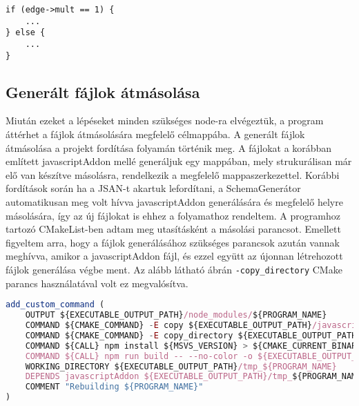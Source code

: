 \begin{lstlisting}[caption={Él szetterek fájlba írása},label={lst:edgefilter}, style={CStyle}]
if (edge->mult == 1) {
    ...
} else {
    ...
}
\end{lstlisting}

\subsection{Generált fájlok átmásolása}

Miután ezeket a lépéseket minden szükséges node-ra elvégeztük, a program áttérhet a fájlok átmásolására megfelelő célmappába.
A generált fájlok átmásolása a projekt fordítása folyamán történik meg. A fájlokat a korábban említett javascriptAddon mellé generáljuk egy mappában, mely strukurálisan már elő van készítve másolásra, rendelkezik a megfelelő mappaszerkezettel. Korábbi fordítások során ha a JSAN-t akartuk lefordítani, a SchemaGenerátor automatikusan meg volt hívva javascriptAddon generálására és megfelelő helyre másolására, így az új fájlokat is ehhez a folyamathoz rendeltem. A programhoz tartozó CMakeList-ben adtam meg utasításként a másolási parancsot. Emellett figyeltem arra, hogy a fájlok generálásához szükséges parancsok azután vannak meghívva, amikor a javascriptAddon fájl, és ezzel együtt az újonnan létrehozott fájlok generálása végbe ment.
Az alább látható ábrán \texttt{-copy\_directory} CMake parancs használatával volt ez megvalósítva.

\begin{lstlisting}[caption={JSAN Cmake utasítások},label={lst:jsancmake}, language={JavaScript}, basicstyle=\fontsize{9}{11}\selectfont\ttfamily]
add_custom_command (
    OUTPUT ${EXECUTABLE_OUTPUT_PATH}/node_modules/${PROGRAM_NAME}
    COMMAND ${CMAKE_COMMAND} -E copy ${EXECUTABLE_OUTPUT_PATH}/javascriptAddon.node ${EXECUTABLE_OUTPUT_PATH}/tmp_${PROGRAM_NAME}/
    COMMAND ${CMAKE_COMMAND} -E copy_directory ${EXECUTABLE_OUTPUT_PATH}/../lib/javascript/addon/ast ${EXECUTABLE_OUTPUT_PATH}/tmp_${PROGRAM_NAME}/src/ast/
    COMMAND ${CALL} npm install ${MSVS_VERSION} > ${CMAKE_CURRENT_BINARY_DIR}/${PROGRAM_NAME}-npm-install.log 2>&1
    COMMAND ${CALL} npm run build -- --no-color -o ${EXECUTABLE_OUTPUT_PATH}/node_modules/${PROGRAM_NAME} > ${CMAKE_CURRENT_BINARY_DIR}/${PROGRAM_NAME}-npm-build.log 2>&1
    WORKING_DIRECTORY ${EXECUTABLE_OUTPUT_PATH}/tmp_${PROGRAM_NAME}
    DEPENDS javascriptAddon ${EXECUTABLE_OUTPUT_PATH}/tmp_${PROGRAM_NAME}
    COMMENT "Rebuilding ${PROGRAM_NAME}"
)
\end{lstlisting}

